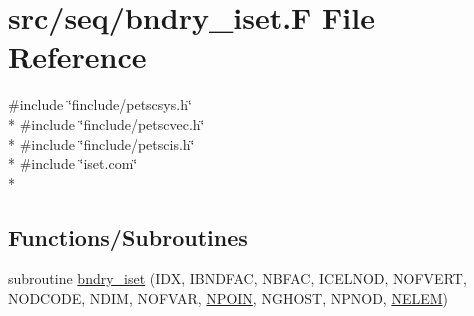 \hypertarget{seq_2bndry__iset_8_f}{\section{src/seq/bndry\-\_\-iset.F File Reference}
\label{seq_2bndry__iset_8_f}
}
{\ttfamily \#include \char`\"{}finclude/petscsys.\-h\char`\"{}}\\*
{\ttfamily \#include \char`\"{}finclude/petscvec.\-h\char`\"{}}\\*
{\ttfamily \#include \char`\"{}finclude/petscis.\-h\char`\"{}}\\*
{\ttfamily \#include \char`\"{}iset.\-com\char`\"{}}\\*
\subsection*{Functions/\-Subroutines}
\begin{DoxyCompactItemize}
\item 
subroutine \hyperlink{seq_2bndry__iset_8_f_a3ce236fe0d6f207b1ab939ebe105fcd1}{bndry\-\_\-iset} (I\-D\-X, I\-B\-N\-D\-F\-A\-C, N\-B\-F\-A\-C, I\-C\-E\-L\-N\-O\-D, N\-O\-F\-V\-E\-R\-T, N\-O\-D\-C\-O\-D\-E, N\-D\-I\-M, N\-O\-F\-V\-A\-R, \hyperlink{mesh_8com_ae28c1572321efcd8715b974d87d20c58}{N\-P\-O\-I\-N}, N\-G\-H\-O\-S\-T, N\-P\-N\-O\-D, \hyperlink{mesh_8com_aee5e75b79d0e815c0603cfbccc618957}{N\-E\-L\-E\-M})
\end{DoxyCompactItemize}


